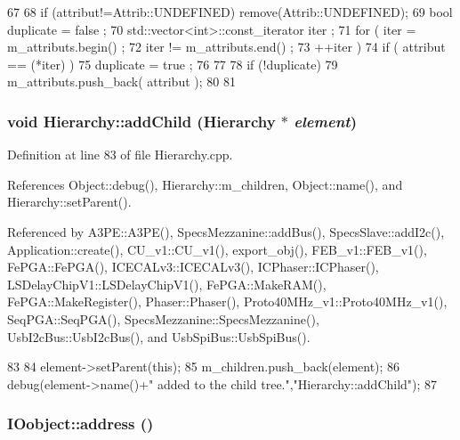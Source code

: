 \begin{DoxyCode}
67                             {
68     if (attribut!=Attrib::UNDEFINED) remove(Attrib::UNDEFINED);
69     bool duplicate = false ;
70     std::vector<int>::const_iterator iter ;
71     for ( iter  = m_attributs.begin() ;
72           iter != m_attributs.end()   ;
73           ++iter ) {
74       if ( attribut == (*iter) ) {
75         duplicate = true ;
76       }
77     }
78     if (!duplicate) {
79       m_attributs.push_back( attribut );
80     }
81   }
\end{DoxyCode}
\hypertarget{classHierarchy_ad677774ff38fcb257c04a3a10d471fac}{
\subsubsection[{addChild}]{\setlength{\rightskip}{0pt plus 5cm}void Hierarchy::addChild ({\bf Hierarchy} $\ast$ {\em element})}}
\label{classHierarchy_ad677774ff38fcb257c04a3a10d471fac}


Definition at line 83 of file Hierarchy.cpp.

References Object::debug(), Hierarchy::m\_\-children, Object::name(), and Hierarchy::setParent().

Referenced by A3PE::A3PE(), SpecsMezzanine::addBus(), SpecsSlave::addI2c(), Application::create(), CU\_\-v1::CU\_\-v1(), export\_\-obj(), FEB\_\-v1::FEB\_\-v1(), FePGA::FePGA(), ICECALv3::ICECALv3(), ICPhaser::ICPhaser(), LSDelayChipV1::LSDelayChipV1(), FePGA::MakeRAM(), FePGA::MakeRegister(), Phaser::Phaser(), Proto40MHz\_\-v1::Proto40MHz\_\-v1(), SeqPGA::SeqPGA(), SpecsMezzanine::SpecsMezzanine(), UsbI2cBus::UsbI2cBus(), and UsbSpiBus::UsbSpiBus().


\begin{DoxyCode}
83                                           {
84   element->setParent(this);
85   m_children.push_back(element);
86   debug(element->name()+" added to the child tree.","Hierarchy::addChild");
87 }
\end{DoxyCode}
\hypertarget{classIOobject_a95f0d3f092ea1ae3037ac60f0674d095}{
\subsubsection[{address}]{ IOobject::address ()}}
\label{classIOobject_a95f0d3f092ea1ae3037ac60f0674d095}


